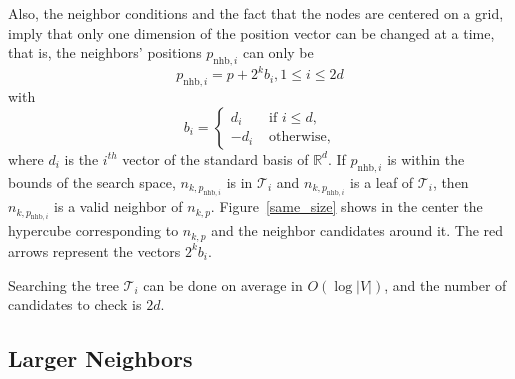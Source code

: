 \documentclass[letterpaper, 10 pt, conference]{ieeeconf}
\theoremstyle{definition}
\begin{document}
Also, the neighbor conditions and the fact that the nodes are centered on a grid, imply that only one dimension of the position vector can be changed at a time, that is, the neighbors' positions $p_{\mathrm{nhb},i}$ can only be
\[ p_{\mathrm{nhb},i}=p+2^k b_i, 1\leq i \leq 2d\]
with
\[ b_i=\begin{cases}
                        d_i &\text{ if }i\leq d, \\
                        -d_i &\text{ otherwise,}
                    \end{cases} \]
where $d_i$ is the $i^{th}$ vector of the standard basis of $\mathbb{R}^d$.
If $p_{\mathrm{nhb},i}$ is within the bounds of the search space, $n_{k,p_{\mathrm{nhb},i}}$ is in $\mathcal{T}_i$ and $n_{k,p_{\mathrm{nhb},i}}$ is a leaf of $\mathcal{T}_i$, then $n_{k,p_{\mathrm{nhb},i}}$ is a valid neighbor of $n_{k,p}$.
Figure~\ref{same_size} shows in the center the hypercube corresponding to $n_{k,p}$ and the neighbor candidates around it. The red arrows represent the vectors $2^k b_i$.

Searching the tree $\mathcal{T}_i$ can be done on average in $O(\log \vert V \vert)$, and the number of candidates to check is $2d$.

\subsection{Larger Neighbors}
\end{document}
